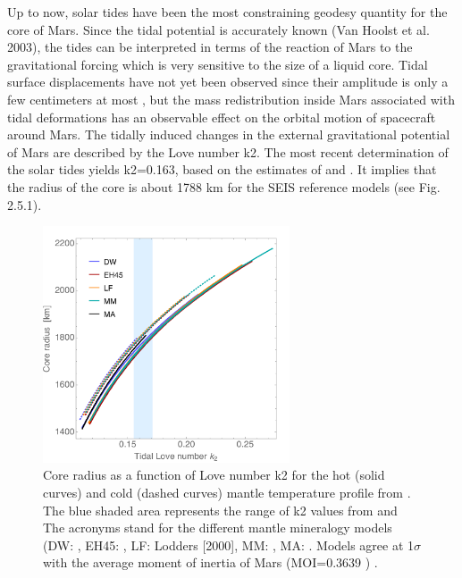 Up to now, solar tides have been the most constraining geodesy quantity for the core of Mars. Since the tidal potential is accurately known (Van Hoolst et al. 2003), the tides can be interpreted in terms of the reaction of Mars to the gravitational forcing which is very sensitive to the size of a liquid core. Tidal surface displacements have not yet been observed since their amplitude is only a few centimeters at most \cite{VanHoolst2003}, but the mass redistribution inside Mars associated with tidal deformations has an observable effect on the orbital motion of spacecraft around Mars. The tidally induced changes in the external gravitational potential of Mars are described by the Love number k2. The most recent determination of the solar tides yields k2=0.163, based on the estimates of \cite{Konopliv2016} and \cite{Genova2016}. It implies that the radius of the core is about 1788  km for the SEIS reference models (see Fig. 2.5.1). 

\begin{figure}[h!]
\begin{center}
\includegraphics[width=0.65\textwidth]
{figures/Geodesytable.png}
\caption{ Core radius as a function of Love number k2 for the hot (solid curves) and cold (dashed curves) mantle temperature profile from \citep{Panning2016}.  The blue shaded area represents the range of k2 values from \citep{Konopliv2016} and \citep{Genova2016} The acronyms stand for the different mantle mineralogy models (DW: \citep{Taylor2013}, EH45: \citep{Sanloup1999}, LF: Lodders [2000], MM: \citep{Mohapatra&Murty2003}, MA: \citep{Morgan1979}. Models agree at 1$\sigma$ with the average moment of inertia of Mars (MOI=0.3639 ) \citep{Konopliv2016}.} 
\label{fig:Geodesytable.png} 
\end{center}
\end{figure}

